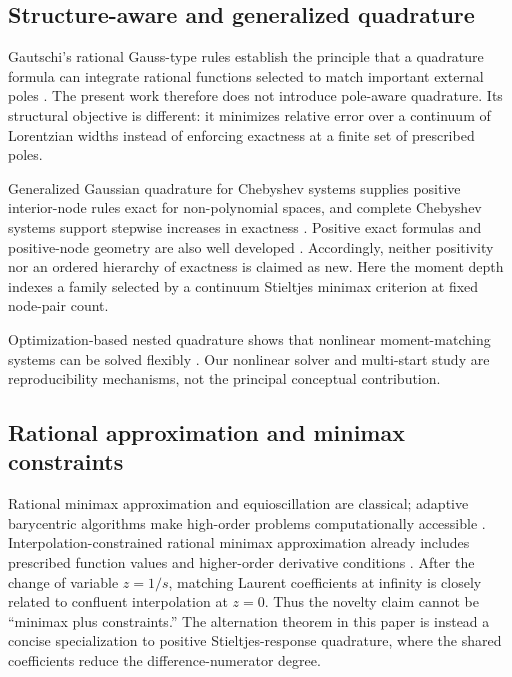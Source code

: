 \documentclass[preprint,12pt]{elsarticle}
\theoremstyle{remark}
\begin{document}
\subsection{Structure-aware and generalized quadrature}

Gautschi's rational Gauss-type rules establish the principle that a
quadrature formula can integrate rational functions selected to match
important external poles \cite{gautschi1993}. The present work therefore
does not introduce pole-aware quadrature. Its structural objective is
different: it minimizes relative error over a continuum of Lorentzian
widths instead of enforcing exactness at a finite set of prescribed
poles.

Generalized Gaussian quadrature for Chebyshev systems supplies positive
interior-node rules exact for non-polynomial spaces, and complete
Chebyshev systems support stepwise increases in exactness
\cite{huybrechs2017}. Positive exact formulas and positive-node
geometry are also well developed \cite{vandebos2019,glaubitz2020}.
Accordingly, neither positivity nor an ordered hierarchy of exactness is
claimed as new. Here the moment depth indexes a family selected by a
continuum Stieltjes minimax criterion at fixed node-pair count.

Optimization-based nested quadrature shows that nonlinear
moment-matching systems can be solved flexibly
\cite{keshavarzzadeh2018}. Our nonlinear solver and multi-start study
are reproducibility mechanisms, not the principal conceptual
contribution.

\subsection{Rational approximation and minimax constraints}

Rational minimax approximation and equioscillation are classical;
adaptive barycentric algorithms make high-order problems computationally
accessible \cite{filip2018}. Interpolation-constrained rational minimax
approximation already includes prescribed function values and
higher-order derivative conditions \cite{zhang2025}. After the change
of variable \(z=1/s\), matching Laurent coefficients at infinity is
closely related to confluent interpolation at \(z=0\). Thus the novelty
claim cannot be ``minimax plus constraints.'' The alternation theorem in
this paper is instead a concise specialization to positive
Stieltjes-response quadrature, where the shared coefficients reduce the
difference-numerator degree.
\end{document}
